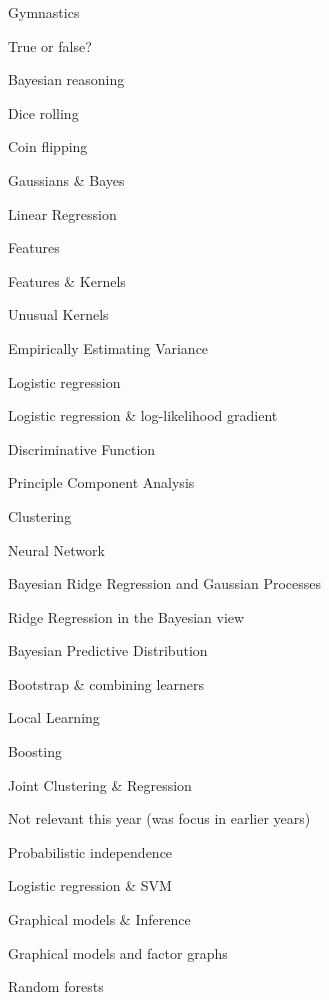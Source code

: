 \begin{items}
\item Gymnastics
\item True or false?
\item Bayesian reasoning
\item Dice rolling
\item Coin flipping
\item Gaussians \& Bayes
\item Linear Regression
\item Features
\item Features \& Kernels
\item Unusual Kernels
\item Empirically Estimating Variance
\item Logistic regression
\item Logistic regression \& log-likelihood gradient
\item Discriminative Function
\item Principle Component Analysis
\item Clustering
\item Neural Network
\item Bayesian Ridge Regression and Gaussian Processes
\item Ridge Regression in the Bayesian view
\item Bayesian Predictive Distribution
\item Bootstrap \& combining learners
\item Local Learning
\item Boosting
\item Joint Clustering \& Regression
\end{items}

Not relevant this year (was focus in earlier years)
\begin{items}
\item Probabilistic independence
\item Logistic regression \& SVM
\item Graphical models \& Inference
\item Graphical models and factor graphs 
\item Random forests
\end{items}


\clearpage
{}
\printindex



